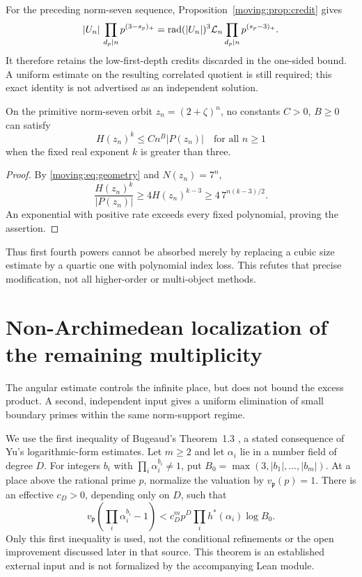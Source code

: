 For the preceding norm-seven sequence, Proposition~\ref{moving:prop:credit} gives
\[
 |U_n|\,\prod_{d_p\mid n}p^{(3-s_p)_+}
  =\operatorname{rad}(|U_n|)^3\mathcal L_n
    \prod_{d_p\mid n}p^{(s_p-3)_+}.
\]
It therefore retains the low-first-depth credits discarded in the one-sided bound. A uniform estimate on the resulting correlated quotient is still required; this exact identity is not advertised as an independent solution.

\begin{proposition}\label{moving:prop:degree}
On the primitive norm-seven orbit $z_n=(2+\zeta)^n$, no constants $C>0$, $B\ge0$ can satisfy
\[
 H(z_n)^k\le C n^B |P(z_n)|\quad\text{for all }n\ge1
\]
when the fixed real exponent $k$ is greater than three.
\end{proposition}
\begin{proof}
By \eqref{moving:eq:geometry} and $N(z_n)=7^n$,
\[
 \frac{H(z_n)^k}{|P(z_n)|}
 \ge4H(z_n)^{k-3}\ge4\,7^{n(k-3)/2}.
\]
An exponential with positive rate exceeds every fixed polynomial, proving the assertion.
\end{proof}
Thus first fourth powers cannot be absorbed merely by replacing a cubic size estimate by a quartic one with polynomial index loss. This refutes that precise modification, not all higher-order or multi-object methods.

\section{Non-Archimedean localization of the remaining multiplicity}
\label{moving:sec:adic-moving}
The angular estimate controls the infinite place, but does not bound the excess product. A second, independent input gives a uniform elimination of small boundary primes within the same norm-support regime.

We use the first inequality of Bugeaud's Theorem~1.3 \cite{moving:bugeaud}, a stated consequence of Yu's logarithmic-form estimates. Let $m\ge2$ and let $\alpha_i$ lie in a number field of degree $D$. For integers $b_i$ with $\prod_i\alpha_i^{b_i}\ne1$, put $B_0=\max(3,|b_1|,\ldots,|b_m|)$. At a place above the rational prime $p$, normalize the valuation by $v_{\mathfrak p}(p)=1$. There is an effective $c_D>0$, depending only on $D$, such that
\begin{equation}\label{moving:eq:yu-input}
 v_{\mathfrak p}\left(\prod_i\alpha_i^{b_i}-1\right)
 <c_D^m p^D\prod_i h^*(\alpha_i)\log B_0.
\end{equation}
Only this first inequality is used, not the conditional refinements or the open improvement discussed later in that source. This theorem is an established external input and is not formalized by the accompanying Lean module.

